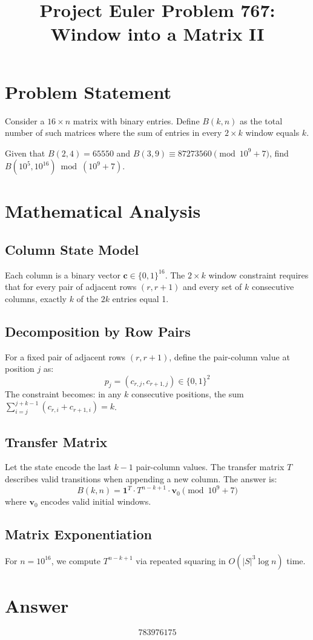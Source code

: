 \documentclass[12pt]{article}
\title{Project Euler Problem 767: Window into a Matrix II}
\author{}
\date{}
\begin{document}
\maketitle

\section{Problem Statement}
Consider a $16 \times n$ matrix with binary entries. Define $B(k, n)$ as the total number of such matrices where the sum of entries in every $2 \times k$ window equals $k$.

Given that $B(2, 4) = 65550$ and $B(3, 9) \equiv 87273560 \pmod{10^9+7}$, find $B(10^5, 10^{16}) \bmod (10^9+7)$.

\section{Mathematical Analysis}

\subsection{Column State Model}
Each column is a binary vector $\mathbf{c} \in \{0,1\}^{16}$. The $2 \times k$ window constraint requires that for every pair of adjacent rows $(r, r+1)$ and every set of $k$ consecutive columns, exactly $k$ of the $2k$ entries equal 1.

\subsection{Decomposition by Row Pairs}
For a fixed pair of adjacent rows $(r, r+1)$, define the pair-column value at position $j$ as:
\[
    p_j = (c_{r,j}, c_{r+1,j}) \in \{0,1\}^2
\]
The constraint becomes: in any $k$ consecutive positions, the sum $\sum_{i=j}^{j+k-1}(c_{r,i} + c_{r+1,i}) = k$.

\subsection{Transfer Matrix}
Let the state encode the last $k-1$ pair-column values. The transfer matrix $T$ describes valid transitions when appending a new column. The answer is:
\[
    B(k, n) = \mathbf{1}^T \cdot T^{n-k+1} \cdot \mathbf{v}_0 \pmod{10^9+7}
\]
where $\mathbf{v}_0$ encodes valid initial windows.

\subsection{Matrix Exponentiation}
For $n = 10^{16}$, we compute $T^{n-k+1}$ via repeated squaring in $O(|S|^3 \log n)$ time.

\section{Answer}

\[
\boxed{783976175}
\]
\end{document}
